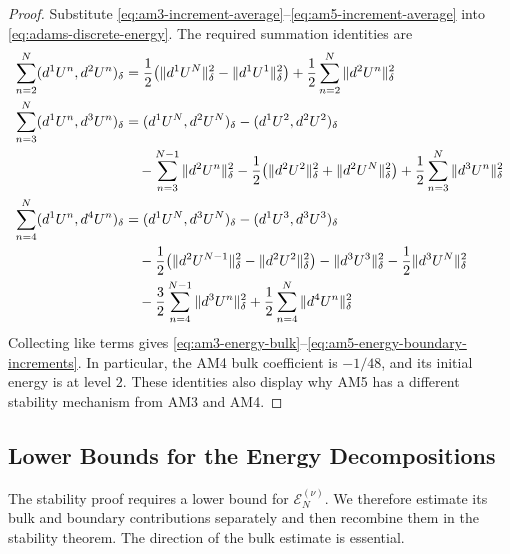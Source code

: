 \documentclass[11pt]{article}
\begin{document}
\begin{proof}
Substitute
\eqref{eq:am3-increment-average}--\eqref{eq:am5-increment-average} into
\eqref{eq:adams-discrete-energy}. The required summation identities are
\begin{align}
\sum_{n=2}^N(d^1U^n,d^2U^n)_{\delta}
&=\frac12\bigl(\|d^1U^N\|_{\delta}^2
-\|d^1U^1\|_{\delta}^2\bigr)
+\frac12\sum_{n=2}^N\|d^2U^n\|_{\delta}^2 \label{eq:du-d2u}\\
\sum_{n=3}^N(d^1U^n,d^3U^n)_{\delta}
&=(d^1U^N,d^2U^N)_{\delta}
-(d^1U^2,d^2U^2)_{\delta} \label{eq:adams-sbp-third-endpoints}\\
&\quad-\sum_{n=3}^{N-1}\|d^2U^n\|_{\delta}^2
-\frac12\bigl(\|d^2U^2\|_{\delta}^2
+\|d^2U^N\|_{\delta}^2\bigr)
+\frac12\sum_{n=3}^N\|d^3U^n\|_{\delta}^2 \label{eq:adams-sbp-third-bulk}\\
\sum_{n=4}^N(d^1U^n,d^4U^n)_{\delta}
&=(d^1U^N,d^3U^N)_{\delta}
-(d^1U^3,d^3U^3)_{\delta} \label{eq:sbp4}\\
&\quad-\frac12\bigl(\|d^2U^{N-1}\|_{\delta}^2
-\|d^2U^2\|_{\delta}^2\bigr)
-\|d^3U^3\|_{\delta}^2
-\frac12\|d^3U^N\|_{\delta}^2 \notag\\
&\quad-\frac32\sum_{n=4}^{N-1}\|d^3U^n\|_{\delta}^2
+\frac12\sum_{n=4}^N\|d^4U^n\|_{\delta}^2 \label{eq:adams-sbp-fourth-bulk}
\end{align}
Collecting like terms gives
\eqref{eq:am3-energy-bulk}--\eqref{eq:am5-energy-boundary-increments}.
In particular, the AM4 bulk coefficient is \(-1/48\), and its initial
energy is at level \(2\). These identities also display why AM5 has a
different stability mechanism from AM3 and AM4.
\end{proof}


\subsection{Lower Bounds for the Energy Decompositions}
\label{subsec:adams-energy-lower-bounds}
The stability proof requires a lower bound for \(\mathcal E_N^{(\nu)}\).
We therefore estimate its bulk and boundary contributions separately and
then recombine them in the stability theorem. The direction of the bulk
estimate is essential.
\end{document}
